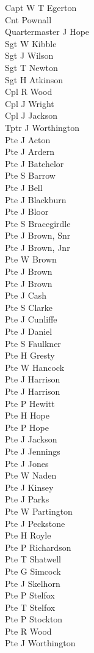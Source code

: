 \begin{multicols}{3}
  \small
  \noindent
  Capt W T Egerton \\
  Cnt Pownall \\
  Quartermaster J Hope \\
  Sgt W Kibble \\
  Sgt J Wilson \\
  Sgt T Newton \\
  Sgt H Atkinson \\
  Cpl R Wood \\
  Cpl J Wright \\
  Cpl J Jackson \\
  Tptr J Worthington \\
  Pte J Acton \\
  Pte J Ardern \\
  Pte J Batchelor \\
  Pte S Barrow \\
  Pte J Bell \\
  Pte J Blackburn \\
  Pte J Bloor \\
  Pte S Bracegirdle \\
  Pte J Brown, Snr \\
  Pte J Brown, Jnr \\
  Pte W Brown \\
  Pte J Brown \\
  Pte J Brown \\
  Pte J Cash \\
  Pte S Clarke \\
  Pte J Cunliffe \\
  Pte J Daniel \\
  Pte S Faulkner \\
  Pte H Gresty \\
  Pte W Hancock \\
  Pte J Harrison \\
  Pte J Harrison \\
  Pte P Hewitt \\
  Pte H Hope \\
  Pte P Hope \\
  Pte J Jackson \\
  Pte J Jennings \\
  Pte J Jones \\
  Pte W Naden \\
  Pte J Kinsey \\
  Pte J Parks \\
  Pte W Partington \\
  Pte J Peckstone \\
  Pte H Royle \\
  Pte P Richardson \\
  Pte T Shatwell \\
  Pte G Simcock \\
  Pte J Skelhorn \\
  Pte P Stelfox \\
  Pte T Stelfox \\
  Pte P Stockton \\
  Pte R Wood \\
  Pte J Worthington \\
\end{multicols}

